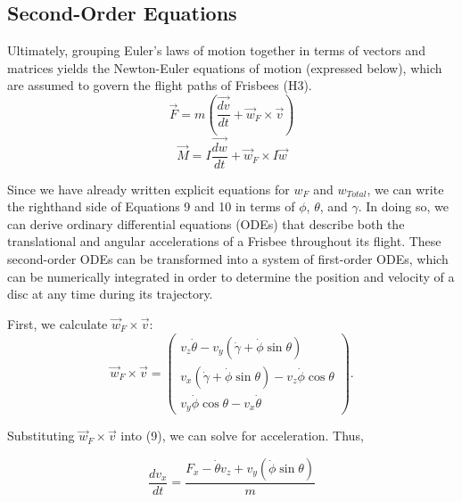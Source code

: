 \documentclass[a4paper,12pt, oneside]{article}
\newcommand{\blue}[1]{\textcolor{blue}{#1}}
\begin{document}
\subsection{Second-Order Equations}

Ultimately, grouping Euler's laws of motion together in terms of vectors and matrices yields the Newton-Euler equations of motion (expressed below), which are assumed to govern the flight paths of Frisbees (H3). 
\begin{equation}
  \label{eq:newton3}
  \vec{F}=\textit{m}(\dfrac{\vec{dv}}{dt}+\vec{\textit{w}}_F\times\vec{v})
\end{equation}
\begin{equation}
  \label{eq:newton4}
  \vec{M}=I\dfrac{\vec{dw}}{dt}+\vec{\textit{w}}_F\times I \vec{w}
\end{equation}

Since we have already written explicit equations for $\textit{w}_F$ and $\textit{w}_{Total}$, we can write the righthand side of Equations 9 and 10 in terms of $\phi$, $\theta$, and $\gamma$. In doing so, we can derive ordinary differential equations (ODEs) that describe both the translational and angular accelerations of a Frisbee throughout its flight. These second-order ODEs can be transformed into a system of first-order ODEs, which can be numerically integrated in order to determine the position and velocity of a disc at any time during its trajectory. 


First, we calculate $\vec{w}_F\times\vec{v}$: 
\begin{equation*}
\vec{w}_F\times\vec{v}=\left(\begin{array}{ccc} v_z\dot\theta-v_y(\dot\gamma+\dot\phi\sin\theta) \\ v_x(\dot\gamma+\dot\phi\sin\theta)-v_z\dot\phi\cos\theta \\ v_y\dot\phi\cos\theta-v_x\dot\theta\end{array}\right).
\end{equation*}

Substituting $\vec{w}_F\times\vec{v}$ into (9), we can solve for acceleration. Thus,

\begin{equation}
\frac{{dv}_x}{dt}=\frac{{F}_x-\dot\theta v_z+v_y(\dot\phi\sin\theta)}{m}
\end{equation}
\end{document}
